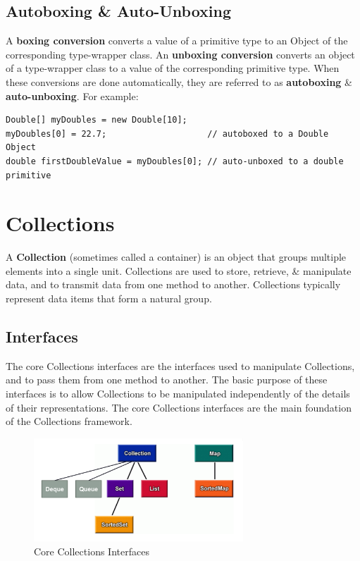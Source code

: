 \documentclass[a4paper,11pt]{article}
\begin{document}
\subsection{Autoboxing \& Auto-Unboxing}
A \textbf{boxing conversion} converts a value of a primitive type to an Object of the corresponding type-wrapper class.
An \textbf{unboxing conversion} converts an object of a type-wrapper class to a value of the corresponding primitive type.
When these conversions are done automatically, they are referred to as \textbf{autoboxing} \& \textbf{auto-unboxing}.
For example:
\begin{verbatim}
Double[] myDoubles = new Double[10];
myDoubles[0] = 22.7;                    // autoboxed to a Double Object
double firstDoubleValue = myDoubles[0]; // auto-unboxed to a double primitive
\end{verbatim}

\section{Collections}
A \textbf{Collection} (sometimes called a container) is an object that groups multiple elements into a single unit.
Collections are used to store, retrieve, \& manipulate data, and to transmit data from one method to another. 
Collections typically represent data items that form a natural group.

\subsection{Interfaces}
The core Collections interfaces are the interfaces used to manipulate Collections, and to pass them from one method to another. 
The basic purpose of these interfaces is to allow Collections to be manipulated independently of the details of their representations.
The core Collections interfaces are the main foundation of the Collections framework.

\begin{figure}[H]
    \centering
    \includegraphics[width=0.7\textwidth]{./images/core_collections_interfaces.png}
    \caption{Core Collections Interfaces}
\end{figure}
\end{document}
